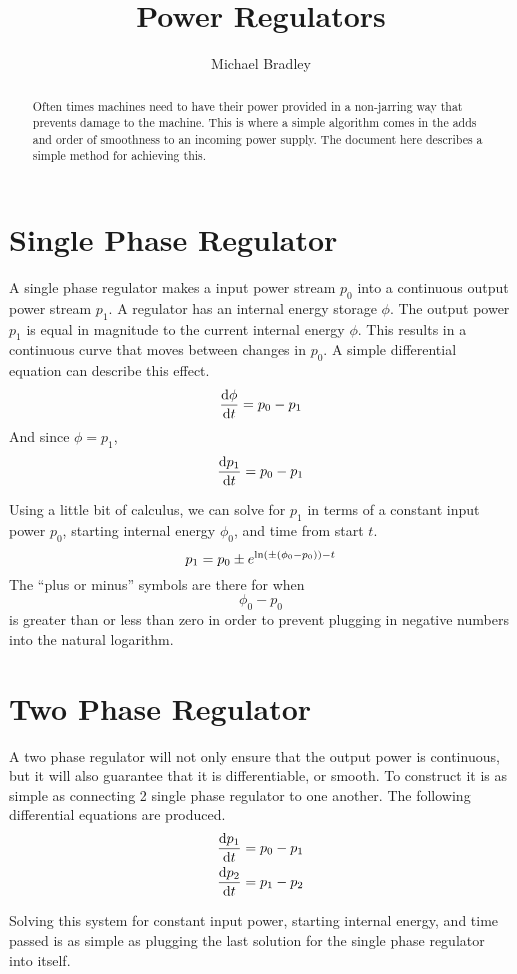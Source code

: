 \documentclass[10pt,letterpaper,twocolumn]{article}
\author{Michael Bradley}
\title{Power Regulators}
\begin{document}
	\maketitle
	\begin{abstract}
		Often times machines need to have their power provided in a non-jarring way that prevents damage to the machine.
		This is where a simple algorithm comes in the adds and order of smoothness to an incoming power supply.
		The document here describes a simple method for achieving this.
	\end{abstract}
	
	\section*{Single Phase Regulator}
	A single phase regulator makes a input power stream $p_0$ into a continuous output power stream $p_1$.
	A regulator has an internal energy storage $\phi$.
	The output power $p_1$ is equal in magnitude to the current internal energy $\phi$.
	This results in a continuous curve that moves between changes in $p_0$.
	A simple differential equation can describe this effect.
	\[\dv{\phi}{t} = p_0 - p_1\]
	And since $\phi = p_1$,
	\[\dv{p_1}{t} = p_0 - p_1\]
	
	Using a little bit of calculus, we can solve for $p_1$ in terms of a constant input power $p_0$, starting internal energy $\phi_0$, and time from start $t$.
	\[p_1 = p_0 \pm e^{\ln(\pm\qty(\phi_0 - p_0)) - t}\]
	The ``plus or minus'' symbols are there for when
	\[\phi_0 - p_0\]
	is greater than or less than zero in order to prevent plugging in negative numbers into the natural logarithm.
	
	\section*{Two Phase Regulator}
	A two phase regulator will not only ensure that the output power is continuous, but it will also guarantee that it is differentiable, or smooth.
	To construct it is as simple as connecting 2 single phase regulator to one another.
	The following differential equations are produced.
	\begin{align*}
		\dv{p_1}{t} &= p_0 - p_1 \\
		\dv{p_2}{t} &= p_1 - p_2
	\end{align*}
	
	Solving this system for constant input power, starting internal energy, and time passed is as simple as plugging the last solution for the single phase regulator into itself.
	
\end{document}

